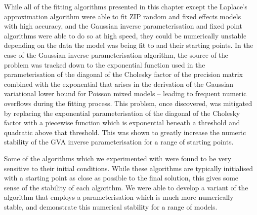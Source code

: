 While all of the fitting algorithms presented in this chapter except the
Laplace's approximation algorithm were able to fit ZIP random and fixed effects
models with high accuracy, and the  Gaussian inverse parameterisation and fixed
point algorithms were able to do so at high speed, they  could be numerically
unstable depending on the data the model was being fit to and their starting
points. In the case of the Gaussian inverse parameterisation algorithm, the
source of the problem was tracked down to the exponential function used in the
parameterisation of the diagonal of the Cholesky factor of the precision matrix
combined with the exponential that arises in the derivation of the Gaussian
variational lower bound for Poisson mixed models -- leading to frequent numeric
overflows during the fitting process. This problem, once discovered, was
mitigated by replacing the exponential parameterisation of the diagonal of the
Cholesky factor with a piecewise function which is exponential beneath a
threshold and quadratic above that threshold. This was shown to greatly
increase the numeric stability of the GVA inverse parameterisation for a range
of starting points.

Some of the algorithms which we experimented with were found to be very
sensitive to their initial conditions.  While these algorithms are typically
initialised with a starting point as close as possible to the final solution,
this gives some sense of the stability of each algorithm. We were able to
develop a variant of the algorithm that employs a parameterisation which is
much more numerically stable, and demonstrate this numerical stability for a
range of models.
